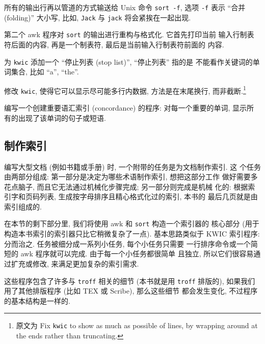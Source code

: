 所有的输出行再以管道的方式输送给 Unix 命令 \texttt{sort -f}, 选项
\texttt{-f} 表示 ``合并 (folding)'' 大小写, 比如, \texttt{Jack} 与 
\texttt{jack} 将会紧挨在一起出现.

第二个 awk 程序对 \texttt{sort} 的输出进行重构与格式化. 它首先打印当前
输入行制表符后面的内容, 再是一个制表符, 最后是当前输入行制表符前面的
内容.

\begin{exercise}
    为 \texttt{kwic} 添加一个 ``停止列表 (stop list)'', ``停止列表'' 指的是 
    不能看作关键词的单词集合, 比如 ``a'', ``the''.
\end{exercise}

\begin{exercise}
    修改 \texttt{kwic}, 使得它可以显示尽可能多行内数据, 方法是在末尾换行,
    而非截断.\footnote{原文为 Fix \texttt{kwic} to show as much as possible
    of lines, by wrapping around at the ends rather than truncating.}
\end{exercise}

\begin{exercise}
    编写一个创建重要语汇索引 (concordance) 的程序: 对每一个重要的单词,
    显示所有的出现了该单词的句子或短语.
\end{exercise}

\subsection{制作索引}
\label{subsec:making_indexes}

编写大型文档 (例如书籍或手册) 时, 一个附带的任务是为文档制作索引. 这
个任务由两部分组成: 第一部分是决定为哪些术语制作索引, 想把这部分工作
做好需要多花点脑子, 而且它无法通过机械化步骤完成; 另一部分则完成是机械
化的: 根据索引字和页码列表, 生成按字母排序且精心格式化过的索引, 本书的
最后几页就是由索引组成的.

在本节的剩下部分里, 我们将使用 awk 和 \texttt{sort} 构造一个索引器的
核心部分 (用于构造本书索引的索引器只比它稍微复杂了一点). 基本思路类似于
KWIC 索引程序: 分而治之. 任务被细分成一系列小任务, 每个小任务只需要
一行排序命令或一个简短的 awk 程序就可以完成. 由于每一个小任务都很简单
且独立, 所以它们很容易通过扩充或修改, 来满足更加复杂的索引需求.

这些程序包含了许多与 \texttt{troff} 相关的细节 (本书就是用 \texttt{troff}
排版的), 如果我们用了其他排版程序 (比如 TEX 或 Scribe), 那么这些细节
都会发生变化, 不过程序的基本结构是一样的.

